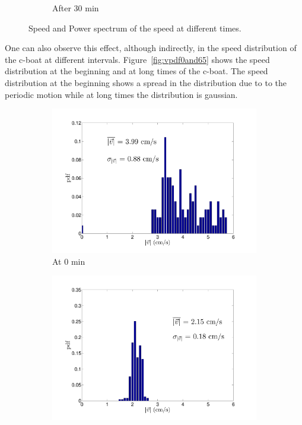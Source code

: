 \documentclass[12pt]{article}
\begin{document}
\begin{figure}[h!]
\begin{subfigure}[h!]{\textwidth}
       \caption{After 30 min}
       \label{fig:vs30min}
	\end{subfigure}
	\caption{Speed and Power spectrum of the speed at different times.}
	\label{fig:vsAll}
\end{figure}
One can also observe this effect, although indirectly, in the speed distribution of the c-boat at different intervals. Figure~\ref{fig:vpdf0and65} shows the speed distribution at the beginning and at long times of the c-boat. The speed distribution at the beginning shows a spread in the distribution due to to the periodic motion while at long times the distribution is gaussian. 

\begin{figure}[h!]
	\begin{subfigure}[h!]{0.5\textwidth}
    \centering
       \includegraphics[scale=0.3]{cb_1_v_pdf_0min.pdf}
       \caption{At 0 min}
       \label{fig:vpdf0min}
	\end{subfigure}
	\hfill
	\begin{subfigure}[h!]{0.5\textwidth}
    \centering
       \includegraphics[scale=0.3]{cb_1_v_pdf_65min.pdf}

\end{subfigure}
\end{figure}
\end{document}
